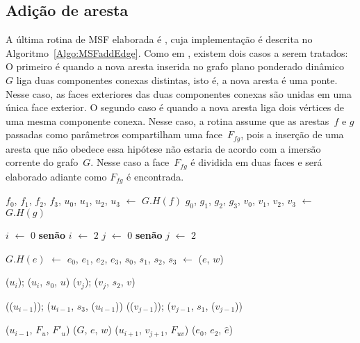 \subsection{Adição de aresta}

A última rotina de MSF elaborada é \MSFaddEdge{}, cuja implementação é descrita no Algoritmo~\ref{Algo:MSFaddEdge}.
Como em \MSFdelEdge{}, existem dois casos a serem tratados: O primeiro é quando a nova aresta inserida no grafo plano ponderado dinâmico~$G$ liga duas componentes conexas distintas, isto é, a nova aresta é uma ponte.
Nesse caso, as faces exteriores das duas componentes conexas são unidas em uma única face exterior.
O segundo caso é quando a nova aresta liga dois vértices de uma mesma componente conexa.
Nesse caso, a rotina \MSFaddEdge{} assume que as arestas~$f$ e $g$ passadas como parâmetros compartilham uma face~$F_{fg}$, pois a inserção de uma aresta que não obedece essa hipótese não estaria de acordo com a imersão corrente do grafo~$G$.
Nesse caso a face~$F_{fg}$ é dividida em duas faces e será elaborado adiante como $F_{fg}$ é encontrada.

\begin{algorithm}[htb]
\caption{\MSFaddEdge($G$, $e$, $u$, $f$, $v$, $g$, $w$)}
\label{Algo:MSFaddEdge}
\begin{algorithmic}[1]

\State $f_0$, $f_1$, $f_2$, $f_3$, $u_0$, $u_1$, $u_2$, $u_3$ $\gets$ $G.H(f)$ \label{Algo:MSFaddEdge:linha:1}
\State $g_0$, $g_1$, $g_2$, $g_3$, $v_0$, $v_1$, $v_2$, $v_3$ $\gets$ $G.H(g)$ \label{Algo:MSFaddEdge:linha:2}

 $i$ $\gets$ $0$ \textbf{senão} $i$ $\gets$ $2$
\EndIf
{} $j$ $\gets$ $0$ \textbf{senão} $j$ $\gets$ $2$
\EndIf


\State $G.H(e)$ $\gets$ $e_0$, $e_1$, $e_2$, $e_3$, $s_0$, $s_1$, $s_2$, $s_3$ $\gets$ \LCOMakeOcto($e$, $w$) \label{Algo:MSFaddEdge:linha:const3}

\State \LCOCycle($u_i$); \LCOMerge($u_i$, $s_0$, $u$)\label{Algo:MSFaddEdge:merges0}
\State \LCOCycle($v_j$); \LCOMerge($v_j$, $s_2$, $v$)\label{Algo:MSFaddEdge:merges2}


\State \LCOCycle(\treapPredecessor($u_{i-1}$)); \LCOMerge($u_{i-1}$, $s_3$, \LCOFindNode($u_{i-1}$))\label{Algo:MSFaddEdge:merges1}
\State \LCOCycle(\treapPredecessor($v_{j-1}$)); \LCOMerge($v_{j-1}$, $s_1$, \LCOFindNode($v_{j-1}$))\label{Algo:MSFaddEdge:merges3}

\label{Algo:MSFaddEdge:linha:deteccao-caso}
\State \LCOSplit($u_{i-1}$, $F_u$, $F'_u$)\label{Algo:MSFaddEdge:linha:splitnaoponte}
\State \MSFupdate($G$, $e$, $w$)
\Else
\State \LCOMerge($u_{i+1}$, $v_{j+1}$, $F_{uv}$)\label{Algo:MSFaddEdge:linha:mergeponte}
\State \LCOMerge($e_0$, $e_2$, $\hat e$)
\EndIf
\end{algorithmic}
\end{algorithm}

